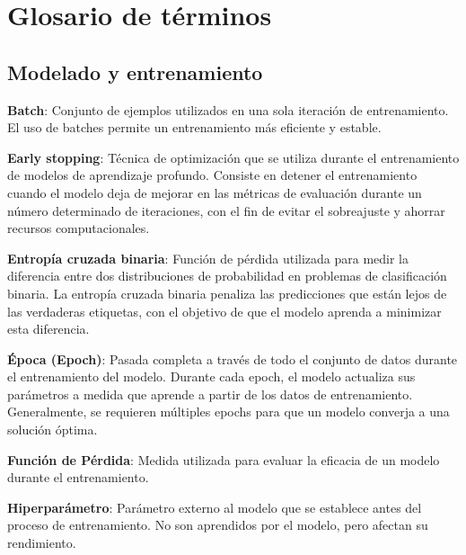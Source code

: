 \section{Glosario de términos}

\subsection{Modelado y entrenamiento}

\textbf{Batch}: Conjunto de ejemplos utilizados en una sola iteración de entrenamiento. El uso de batches permite un entrenamiento más eficiente y estable.

\vspace{5mm}

\textbf{Early stopping}: Técnica de optimización que se utiliza durante el entrenamiento de modelos de aprendizaje profundo. Consiste en detener el entrenamiento cuando el modelo deja de mejorar en las métricas de evaluación durante un número determinado de iteraciones, con el fin de evitar el sobreajuste y ahorrar recursos computacionales.

\vspace{5mm}

\textbf{Entropía cruzada binaria}: Función de pérdida utilizada para medir la diferencia entre dos distribuciones de probabilidad en problemas de clasificación binaria. La entropía cruzada binaria penaliza las predicciones que están lejos de las verdaderas etiquetas, con el objetivo de que el modelo aprenda a minimizar esta diferencia.

\vspace{5mm}

\textbf{Época (Epoch)}: Pasada completa a través de todo el conjunto de datos durante el entrenamiento del modelo. Durante cada epoch, el modelo actualiza sus parámetros a medida que aprende a partir de los datos de entrenamiento. Generalmente, se requieren múltiples epochs para que un modelo converja a una solución óptima.

\vspace{5mm}

\textbf{Función de Pérdida}: Medida utilizada para evaluar la eficacia de un modelo durante el entrenamiento.

\vspace{5mm}

\textbf{Hiperparámetro}: Parámetro externo al modelo que se establece antes del proceso de entrenamiento. No son aprendidos por el modelo, pero afectan su rendimiento.

